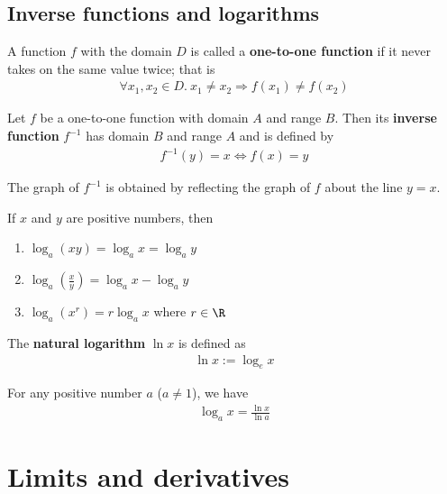 \documentclass{article}
\begin{document}
\subsection{Inverse functions and logarithms}
\begin{definition}
    A function $f$ with the domain $D$ is called a \textbf{one-to-one function} if it never takes on the same value twice; that is
    \begin{align*}
        \forall x_1, x_2 \in D.\: x_1\not=x_2 \Rightarrow f(x_1)\not= f(x_2)
    \end{align*}
\end{definition}
\begin{definition}
    Let $f$ be a one-to-one function with domain $A$ and range $B$. Then its \textbf{inverse function} $f^{-1}$ has domain $B$ and range $A$ and is defined by
    \begin{align*}
        f^{-1}(y) = x \Leftrightarrow f(x) = y
    \end{align*}
\end{definition}
\begin{theorem}
    The graph of $f^{-1}$ is obtained by reflecting the graph of $f$ about the line $y=x$.
\end{theorem}
\begin{theorem}
    If $x$ and $y$ are positive numbers, then
    \begin{enumerate}
        \item $\log_a(xy)=\log_ax=\log_ay$
        \item $\log_a(\frac{x}{y}) = \log_ax - \log_ay$
        \item $\log_a(x^r)=r\log_ax$ where $r\in\R$
    \end{enumerate}
\end{theorem}
\begin{definition}
    The \textbf{natural logarithm} $\ln x$ is defined as
    \begin{align*}
        \ln x := \log_e x
    \end{align*}
\end{definition}
\begin{theorem}
    For any positive number $a$ ($a\not=1$), we have
    \begin{align*}
        \log_a x = \frac{\ln x}{\ln a}
    \end{align*}
\end{theorem}
\section{Limits and derivatives}
\setcounter{subsection}{1}
\end{document}

